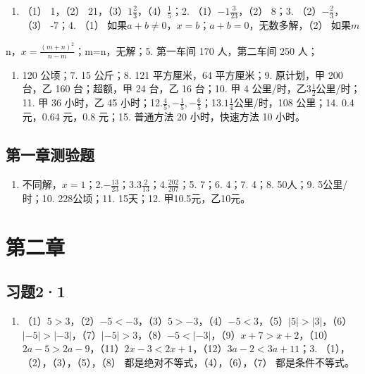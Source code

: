 \begin{enumerate}
\item
  （1） 1，（2） 21，（3）\(1\frac{2}{3}\)，（4）\(\frac{1}{5}\)；2.
  （1）\(-1\frac{3}{23}\)，（2） 8；3. （2）\(-\frac{2}{3}\)，（3）
  -7；4. （1）
  如果\(a + b \neq 0\)，\(x = b\)；\(a + b = 0\)，无数多解，（2）
  如果\(m\)
\end{enumerate}

n，\(x=\frac{(m+n)^{2}}{n-m}\)；m=n，无解；5. 第一车间 170 人，第二车间
250 人；

\begin{enumerate}[start=6]
\item
  120 公顷；7. 15 公斤；8. 121 平方厘米，64 平方厘米；9. 原计划，甲 200
  台，乙 160 台；超额，甲 24 台，乙 16 台；10. 甲 4
  公里/时，乙\(3\frac{1}{2}\)公里/时；11. 甲 36 小时，乙 45
  小时；12.\(\frac{4}{5}, -\frac{1}{5}, -\frac{6}{5}\)；13.\(1\frac{1}{4}\)公里/时，108
  公里；14. 0.4 元，0.64 元，0.8 元；15. 普通方法 20 小时，快速方法 10
  小时。
\end{enumerate}

\subsection{第一章测验题}

\begin{enumerate}
\item
  不同解，\(x = 1\)；2.\(-\frac{13}{23}\)；3.\(3\frac{2}{13}\)；4.\(\frac{202}{207}\)；5.
  7；6. 4；7. 4；8. 50人；9. 5公里/时；10. 228公顷；11. 15天；12.
  甲10.5元，乙10元。
\end{enumerate}

\section{第二章}

\subsection{习题2·1}

\begin{enumerate}
\item
  （1）\(5 > 3\)，（2）\(-5 < -3\)，（3）\(5 > -3\)，（4）\(-5 < 3\)，（5）\(|5| > |3|\)，（6）\(|-5| > |-3|\)，（7）\(|-5| > 3\)，（8）\(-5 < |-3|\)，（9）\(x + 7 > x + 2\)，（10）\(2a - 5 > 2a - 9\)，（11）\(2x - 3 < 2x + 1\)，（12）\(3a - 2 < 3a + 11\)；3.
  （1），（2），（3），（5），（8） 都是绝对不等式，（4），（6），（7）
  都是条件不等式。
\end{enumerate}

